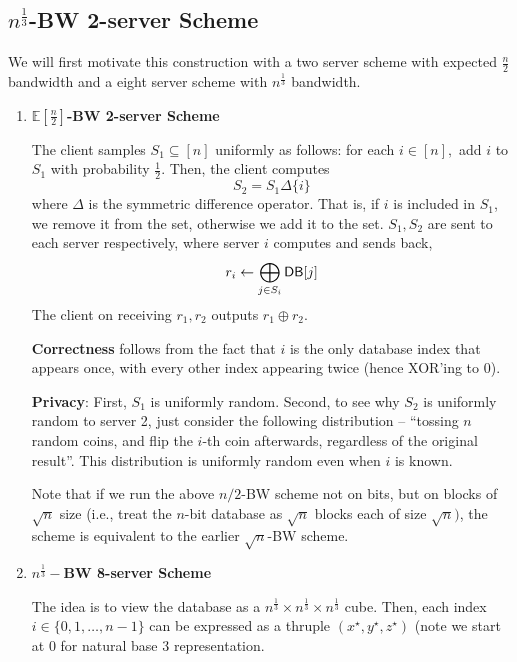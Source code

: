 \subsection{$n^{\frac{1}{3}}$-BW 2-server Scheme\cite{chor1998private}}
We will first motivate this construction with a two server scheme with expected $\frac{n}{2}$ bandwidth and a eight server scheme with $n^{\frac 1 3}$ bandwidth. 
\begin{enumerate}
	\item \textbf{$\mathbb{E}[\frac{n}{2}]$-BW 2-server Scheme}
	
		The client samples $S_{1} \subseteq [n]$ uniformly as follows: for each $i \in [n],$ add $i$ to $S_{1}$ with probability $\frac{1}{2}$. Then, the client computes
		\[S_{2} = S_{1} \Delta \{i\}\]
		where $\Delta$ is the symmetric difference operator. That is, if $i$ is included in $S_1$, we remove it from the set, otherwise we add it to the set. $S_{1},S_{2}$ are sent to each server respectively, where server $i$ computes and sends back,
		\[r_{i} \leftarrow \bigoplus_{j \in S_{i}} {\sf DB}[j]\]
		The client on receiving $r_1,r_2$ outputs $r_1 \oplus r_2$. 
	
		\textbf{Correctness} follows from the fact that $i$ is the only database index that appears once, with every other index appearing twice (hence XOR'ing to 0).

		\textbf{Privacy}: First, $S_1$ is uniformly random. Second, to see why $S_2$ is uniformly random to server 2, just consider the following distribution -- ``tossing $n$ random coins, and flip the $i$-th coin afterwards, regardless of the original result''. This distribution is uniformly random even when $i$ is known. %
        
\begin{remark}        
Note that if we run the above $n/2$-BW scheme not on bits,
but on blocks of $\sqrt{n}$ size (i.e., treat
the $n$-bit database as $\sqrt{n}$ blocks each of size $\sqrt{n})$, 
the scheme is equivalent to the earlier $\sqrt{n}$-BW scheme.
\end{remark}
	
	\item \textbf{$n^{\frac 1 3}-$BW 8-server Scheme}
	
		The idea is to view the database as a $n^{\frac 1 3} \times n^{\frac 1 3} \times n^{\frac 1 3}$ cube. Then, each index $i \in \{0,1,\dots,n - 1\}$ can be expressed as a thruple $(x^\star, y^\star, z^\star)$ (note we start at $0$ for natural base 3 representation.


\end{enumerate}
